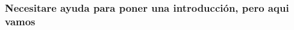 
\begin{frame}
  \frametitle{Necesitare ayuda para poner una introducción, pero aqui vamos}
\end{frame}
